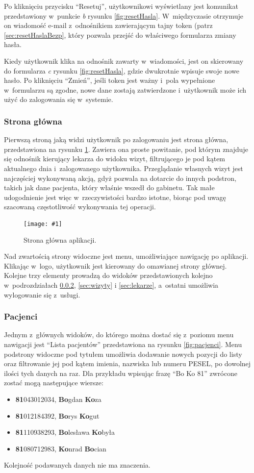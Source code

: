 \documentclass[11pt]{aghdpl}
\newcommand{\fullWidthPicture}[2]{
\begin{figure}[h!]
	\centering
		\texttt{[image: \#1]}
	\caption{#2}
	\label{fig:#1}
\end{figure}
}
\begin{document}
Po kliknięciu przycisku ``Resetuj'', użytkownikowi wyświetlany jest komunikat przedstawiony w~punkcie \emph{b} rysunku \ref{fig:resetHasla}. W~międzyczasie otrzymuje on wiadomość e-mail z~odnośnikiem zawierającym tajny token (patrz \ref{sec:resetHaslaBezp}, który pozwala przejść do właściwego formularza zmiany hasła.

Kiedy użytkownik klika na odnośnik zawarty w~wiadomości, jest on skierowany do formularza \emph{c} rysunku \ref{fig:resetHasla}, gdzie dwukrotnie wpisuje swoje nowe hasło. Po kliknięciu ``Zmień'', jeśli token jest ważny i~pola wypełnione w~formularzu są zgodne, nowe dane zostają zatwierdzone i~użytkownik może ich użyć do zalogowania się w~systemie.

\subsubsection{Strona główna}

Pierwszą stroną jaką widzi użytkownik po zalogowaniu jest strona główna, przedstawiona na rysunku \ref{fig:home}. Zawiera ona proste powitanie, pod którym znajduje się odnośnik kierujący lekarza do widoku wizyt, filtrującego je pod kątem aktualnego dnia i~zalogowanego użytkownika. Przeglądanie własnych wizyt jest najczęściej wykonywaną akcją, gdyż pozwala na dotarcie do innych podstron, takich jak dane pacjenta, który właśnie wszedł do gabinetu. Tak małe udogodnienie jest więc w~rzeczywistości bardzo istotne, biorąc pod uwagę szacowaną częstotliwość wykonywania tej operacji.

\fullWidthPicture{home}{Strona główna aplikacji.}

Nad zwartością strony widoczne jest menu, umożliwiające nawigację po aplikacji. Klikając w~logo, użytkownik jest kierowany do omawianej strony głównej. Kolejne trzy elementy prowadzą do widoków przedstawionych kolejno w~podrozdziałach \ref{sec:pacjenci}, \ref{sec:wizyty} i \ref{sec:lekarze}, a~ostatni umożliwia wylogowanie się z~usługi.

\subsubsection{Pacjenci}
\label{sec:pacjenci}

Jednym z~głównych widoków, do którego można dostać się z~poziomu menu nawigacji jest ``Lista pacjentów'' przedstawiona na rysunku \ref{fig:pacjenci}. Menu podstrony widoczne pod tytułem umożliwia dodawanie nowych pozycji do listy oraz filtrowanie jej pod kątem imienia, nazwiska lub numeru PESEL, po dowolnej ilości tych danych na raz. Dla przykładu wpisując frazę ``Bo Ko 81'' zwrócone zostać mogą następujące wiersze:
\begin{itemize}
	\item \textbf{81}043012034, \textbf{Bo}gdan \textbf{Ko}za
	\item \textbf{81}012184392, \textbf{Bo}rys \textbf{Ko}gut
	\item \textbf{81}110938293, \textbf{Bo}lesława \textbf{Ko}była
	\item \textbf{81}080712983, \textbf{Ko}nrad \textbf{Bo}cian
\end{itemize}
Kolejność podawanych danych nie ma znaczenia.
\end{document}
